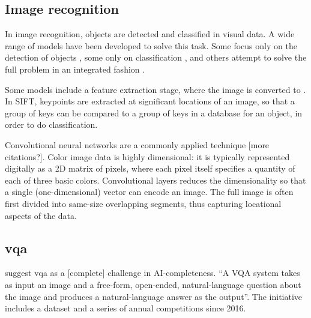 


\subsection{Image recognition}

In image recognition, objects are detected and classified in visual data.
A wide range of models have been developed to solve this task.
Some focus only on the detection of objects \citep{BlaschkoLearningLocalizeObjects2008}, some only on classification \citep[ResNet,][]{HeDeepResidualLearning2015}, and others attempt to solve the full problem in an integrated fashion \citep{RedmonYouOnlyLook2015,HeMaskRCNN2017}.

Some models include a feature extraction stage, where the image is converted to .
In SIFT, keypoints are extracted at significant locations of an image, so that a group of keys can be compared to a group of keys in a database for an object, in order to do classification.

Convolutional neural networks are a commonly applied technique \citep{HeDeepResidualLearning2015} [more citations?].
Color image data is highly dimensional: it is typically represented digitally as a 2D matrix of pixels, where each pixel itself specifies a quantity of each of three basic colors.
Convolutional layers reduces the dimensionality so that a single (one-dimensional) vector can encode an image.
The full image is often first divided into same-size overlapping segments, thus capturing locational aspects of the data.





\subsection{\Acrfull{vqa}}

\cite{AgrawalVQAVisualQuestion2015} suggest \acrfull{vqa} as a [complete] challenge in AI-completeness.
``A VQA system takes as input an image and a free-form, open-ended, natural-language question about the image and produces a natural-language answer as the output''.
The initiative includes a dataset and a series of annual competitions since 2016.

\cite{AndreasLearningComposeNeural2016}